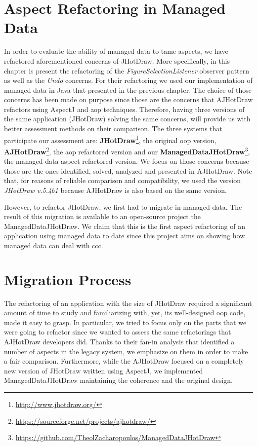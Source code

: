 \section{Aspect Refactoring in Managed Data}
In order to evaluate the ability of managed data to tame aspects, we have refactored aforementioned concerns of JHotDraw.
More specifically, in this chapter is present the refactoring of the \textit{FigureSelectionListener} observer pattern as well as the \textit{Undo} concerns.
For their refactoring we used our implementation of managed data in Java that presented in the previous chapter.
The choice of those concerns has been made on purpose since those are the concerns that AJHotDraw refactors using AspectJ and \ac{aop} techniques.
Therefore, having three versions of the same application (JHotDraw) solving the same concerns, will provide us with better assessment methods on their comparison.
The three systems that participate our assessment are: \textbf{JHotDraw}\footnote{\url{http://www.jhotdraw.org/}}, the original \ac{oop} version, \textbf{AJHotDraw}\footnote{\url{https://sourceforge.net/projects/ajhotdraw/}}, the \ac{aop} refactored version and our \textbf{ManagedDataJHotDraw}\footnote{\url{https://github.com/TheolZacharopoulos/ManagedDataJHotDraw}}, the managed data aspect refactored version.
We focus on those concerns because those are the ones identified, solved, analyzed and presented in AJHotDraw.
Note that, for reasons of reliable comparison and compatibility, we used the version \textit{JHotDraw v.5.4b1} because AJHotDraw is also based on the same version.

However, to refactor JHotDraw, we first had to migrate in managed data.
The result of this migration is available to an open-source project the ManagedDataJHotDraw.
We claim that this is the first aspect refactoring of an application using managed data to date since this project aims on showing how managed data can deal with \ac{ccc}.

\section{Migration Process}
The refactoring of an application with the size of JHotDraw required a significant amount of time to study and familiarizing with, yet, its well-designed \ac{oop} code, made it easy to grasp.
In particular, we tried to focus only on the parts that we were going to refactor since we wanted to assess the same refactorings that AJHotDraw developers \cite{marinajhotdraw} did.
Thanks to their fan-in analysis \cite{marin2004identifying} that identified a number of aspects in the legacy system, we emphasize on them in order to make a fair comparison.
Furthermore, while the AJHotDraw focused on a completely new version of JHotDraw written using AspectJ, we implemented ManagedDataJHotDraw maintaining the coherence and the original design.

